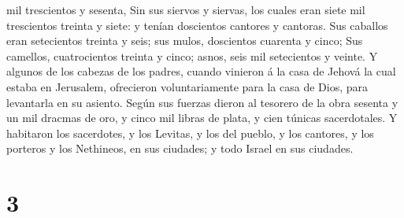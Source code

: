 mil trescientos y sesenta,  Sin sus siervos y siervas, los
cuales eran siete mil trescientos treinta y siete: y tenían doscientos
cantores y cantoras.  Sus caballos eran setecientos treinta
y seis; sus mulos, doscientos cuarenta y cinco;  Sus
camellos, cuatrocientos treinta y cinco; asnos, seis mil setecientos y
veinte.  Y algunos de los cabezas de los padres, cuando
vinieron á la casa de Jehová la cual estaba en Jerusalem, ofrecieron
voluntariamente para la casa de Dios, para levantarla en su asiento.
 Según sus fuerzas dieron al tesorero de la obra sesenta y
un mil dracmas de oro, y cinco mil libras de plata, y cien túnicas
sacerdotales.  Y habitaron los sacerdotes, y los Levitas, y
los del pueblo, y los cantores, y los porteros y los Nethineos, en sus
ciudades; y todo Israel en sus ciudades.

\hypertarget{section-2}{%
\section{3}\label{section-2}}

